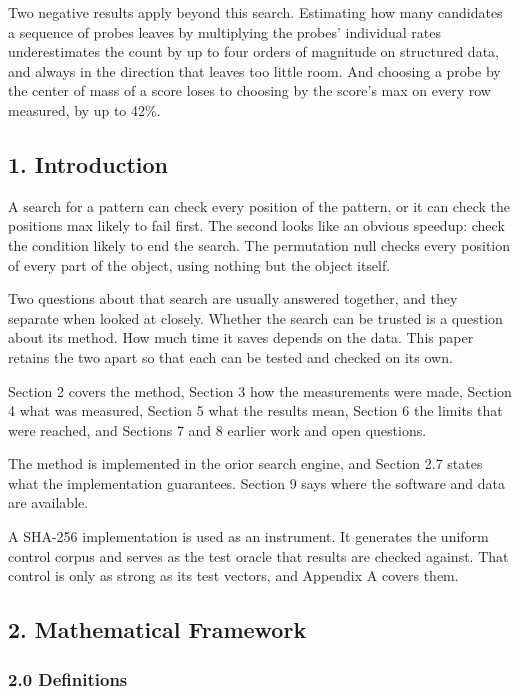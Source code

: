 Two negative results apply beyond this search. Estimating how many candidates a sequence of probes leaves by multiplying the probes' individual rates underestimates the count by up to four orders of magnitude on structured data, and always in the direction that leaves too little room. And choosing a probe by the center of mass of a score loses to choosing by the score's max on every row measured, by up to 42\%.

\subsection{1. Introduction}

A search for a pattern can check every position of the pattern, or it can check the positions max
likely to fail first. The second looks like an obvious speedup: check the condition likely to
end the search. The permutation null checks every position of every part of the object, using
nothing but the object itself.

Two questions about that search are usually answered together, and they separate when looked at
closely. Whether the search can be trusted is a question about its method. How much time it saves
depends on the data. This paper retains the two apart so that each can be tested and checked on its
own.

Section 2 covers the method, Section 3 how the measurements were made, Section 4 what was
measured, Section 5 what the results mean, Section 6 the limits that were reached, and Sections 7
and 8 earlier work and open questions.

The method is implemented in the orior search engine, and Section 2.7 states what the
implementation guarantees. Section 9 says where the software and data are available.

A SHA-256 implementation is used as an instrument. It generates the uniform control corpus and
serves as the test oracle that results are checked against. That control is only as strong as its
test vectors, and Appendix A covers them.

\subsection{2. Mathematical Framework}

\subsubsection{2.0 Definitions}

